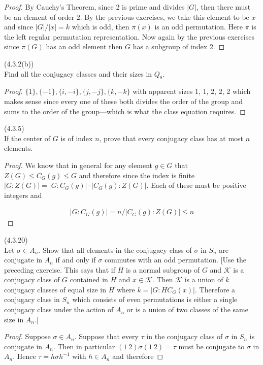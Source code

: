 \documentclass{exam}
\begin{document}
\begin{questions}
\begin{proof}
  By Cauchy's Theorem, since 2 is prime and divides $|G|$, then there must be an element of order 2.  By the previous exercises, we take this element to be $x$ and since $|G|/|x|=k$ which is odd, then $\pi(x)$ is an odd permutation.  Here $\pi$ is the left regular permutation representation.  Now again by the previous exercises since $\pi(G)$ has an odd element then $G$ has a subgroup of index 2.
\end{proof}

\question(4.3.2(b))\\
Find all the conjugacy classes and their sizes in $Q_8$.

\begin{proof}
  $\{1\},\{-1\},\{i,-i\},\{j,-j\},\{k,-k\}$ with apparent sizes 1, 1, 2, 2, 2 which makes sense since every one of these both divides the order of the group and sums to the order of the group---which is what the class equation requires.
\end{proof}

\question(4.3.5)\\
If the center of $G$ is of index $n$, prove that every conjugacy class has at most $n$ elements.

\begin{proof}
  We know that in general for any element $g\in G$ that $Z(G)\leq C_G(g)\leq G$ and therefore since the index is finite $|G:Z(G)|=|G:C_G(g)|\cdot|C_G(g):Z(G)|$.  Each of these must be positive integers and

  \begin{align*}
    |G:C_G(g)| = n/|C_G(g):Z(G)| \leq n
  \end{align*}
\end{proof}

\question(4.3.20)\\
Let $\sigma\in A_n$.  Show that all elements in the conjugacy class of $\sigma$ in $S_n$ are conjugate in $A_n$ if and only if $\sigma$ commutes with an odd permutation.  [Use the preceding exercise.  This says that if $H$ is a normal subgroup of $G$ and $\mathcal K$ is a conjugacy class of $G$ contained in $H$ and $x\in\mathcal K$.  Then $\mathcal K$ is a union of $k$ conjugacy classes of equal size in $H$ where $k=|G:HC_G(x)|$.  Therefore a conjugacy class in $S_n$ which consists of even permutations is either a single conjugacy class under the action of $A_n$ or is a union of two classes of the same size in $A_n$.]

\begin{proof}
  Suppose $\sigma \in A_n$.  Suppose that every $\tau$ in the conjugacy class of $\sigma$ in $S_n$ is conjugate in $A_n$.  Then in particular $(1\ 2)\sigma(1\ 2)=\tau$ must be conjugate to $\sigma$ in $A_n$.  Hence $\tau = h\sigma h^{-1}$ with $h\in A_n$ and therefore


\end{proof}
\end{questions}
\end{document}
